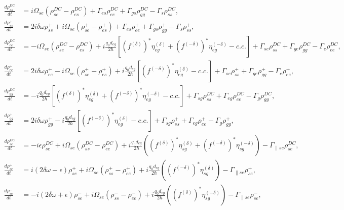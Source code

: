 \documentclass[twocolumn,secnumarabic,amssymb, nobibnotes, aps, prd]{revtex4-1}
\begin{document}
\begin{widetext}
	\begin{align}
	\label{eq:temporal-hole-ss}
	\frac{d\rho_{ss}^{DC}}{dt} &= i\Omega_{se}(\rho_{se}^{DC}-\rho_{es}^{DC}) +  \Gamma_{es}\rho_{ee}^{DC} + \Gamma_{gs}\rho_{gg}^{DC}  -\Gamma_s\rho_{ss}^{DC}, \\
	\frac{d\rho_{ss}^{+}}{dt} &= 2i\delta\omega\rho_{ss}^{+} + i\Omega_{se}(\rho_{se}^{+}-\rho_{es}^{+}) +  \Gamma_{es}\rho_{ee}^{+} + \Gamma_{gs}\rho_{gg}^{+}  -\Gamma_s\rho_{ss}^{+}, \\
	\label{eq:temporal-hole-ee}
	\frac{d\rho_{ee}^{DC}}{dt} &= -i\Omega_{se}(\rho_{se}^{DC}-\rho_{es}^{DC}) + i\frac{q_0d_{eg}}{2\hbar} \left [ ( f^{(\delta)})^*\eta_{eg}^{(\delta)} +(f^{(-\delta)})^*\eta_{eg}^{(-\delta)} -c.c.\right]
	+\Gamma_{se}\rho_{ss}^{DC} + \Gamma_{ge}\rho_{gg}^{DC} - \Gamma_e \rho_{ee}^{DC}, \\
	\frac{d\rho_{ee}^{+}}{dt} &= 2i\delta\omega\rho_{ee}^{+} - i\Omega_{se}(\rho_{se}^{+}-\rho_{es}^{+}) + i\frac{q_0d_{eg}}{2\hbar} \left [ (f^{(-\delta)})^*\eta_{eg}^{(\delta)} -c.c.\right]
	+\Gamma_{se}\rho_{ss}^{+} + \Gamma_{ge}\rho_{gg}^{+} - \Gamma_e \rho_{ee}^{+}, \\
	\frac{d\rho_{gg}^{DC}}{dt} &= -i\frac{q_0d_{eg}}{2\hbar} \left [ ( f^{(\delta)})^*\eta_{eg}^{(\delta)} +(f^{(-\delta)})^*\eta_{eg}^{(-\delta)} -c.c.\right]
	+\Gamma_{sg}\rho_{ss}^{DC} + \Gamma_{eg}\rho_{ee}^{DC} - \Gamma_g \rho_{gg}^{DC}, \\
	\frac{d\rho_{gg}^{+}}{dt} &= 2i\delta\omega\rho_{gg}^{+} - i\frac{q_0d_{eg}}{2\hbar} \left [ (f^{(-\delta)})^*\eta_{eg}^{(\delta)} -c.c.\right]
	+\Gamma_{sg}\rho_{ss}^{+} + \Gamma_{eg}\rho_{ee}^{+} - \Gamma_g \rho_{gg}^{+}, \\
	\frac{d \rho_{se}^{DC}}{d t}  &= -i\epsilon\rho_{se}^{DC} +i \Omega_{se}(\rho_{ss}^{DC} - \rho_{ee}^{DC}) +i\frac{q_0d_{eg}}{2 \hbar}((f^{(\delta)})^*\eta_{sg}^{(\delta)} +(f^{(-\delta)})^*\eta_{sg}^{(-\delta)})- \Gamma_{\parallel se} \rho_{se}^{DC},  \\
	\frac{d \rho_{se}^{+}}{d t}  &= i(2\delta\omega-\epsilon)\rho_{se}^{+} +i \Omega_{se}(\rho_{ss}^{+} - \rho_{ee}^{+}) +i\frac{q_0d_{eg}}{2 \hbar}( (f^{(-\delta)})^*\eta_{sg}^{(\delta)} )- \Gamma_{\parallel se} \rho_{se}^{+},\\
	\frac{d \rho_{se}^{-}}{d t}  &= -i(2\delta\omega+\epsilon)\rho_{se}^{-} +i \Omega_{se}(\rho_{ss}^{-} - \rho_{ee}^{-}) +i\frac{q_0d_{eg}}{2 \hbar}( (f^{(\delta)})^*\eta_{sg}^{(-\delta)} )- \Gamma_{\parallel se} \rho_{se}^{-},  \\

\end{align}
\end{widetext}
\end{document}
